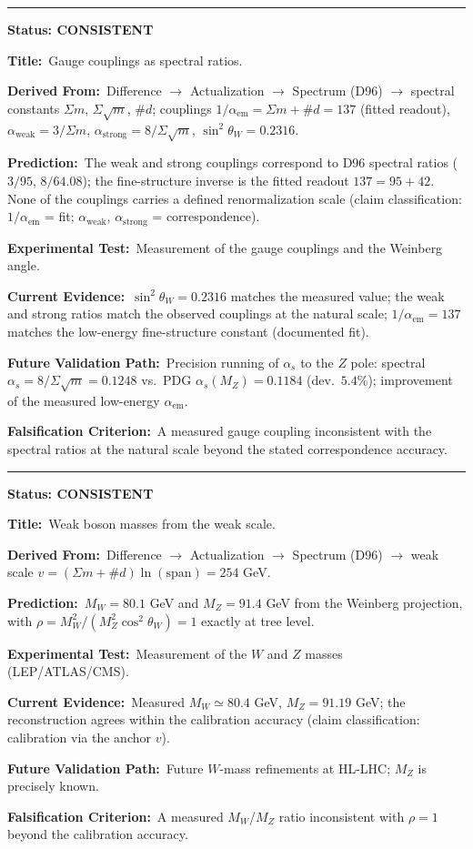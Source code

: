 \documentclass[11pt,a4paper]{article}
\newcommand{\predstart}[2]{%
  \par\medskip\noindent\hrule\par\smallskip
  \noindent{\large\bfseries #1}\hfill{\bfseries Status: #2}\par\smallskip
}
\newcommand{\pfield}[2]{%
  \noindent\textbf{#1:}~#2\par\smallskip
}
\begin{document}
\predstart{AT-P002}{CONSISTENT}
\pfield{Title}{Gauge couplings as spectral ratios.}
\pfield{Derived From}{Difference $\to$ Actualization $\to$ Spectrum (D96) $\to$ spectral
constants $\Sigma m$, $\Sigma\sqrt{m}$, $\#d$; couplings
$1/\alpha_{\mathrm{em}} = \Sigma m + \#d = 137$ (fitted readout),
$\alpha_{\mathrm{weak}} = 3/\Sigma m$, $\alpha_{\mathrm{strong}} = 8/\Sigma\sqrt{m}$,
$\sin^2\theta_W = 0.2316$.}
\pfield{Prediction}{The weak and strong couplings correspond to D96 spectral ratios
($3/95$, $8/64.08$); the fine-structure inverse is the fitted readout $137 = 95+42$.
None of the couplings carries a defined renormalization scale (claim classification:
$1/\alpha_{\mathrm{em}}$ = fit; $\alpha_{\mathrm{weak}}$, $\alpha_{\mathrm{strong}}$ =
correspondence).}
\pfield{Experimental Test}{Measurement of the gauge couplings and the Weinberg angle.}
\pfield{Current Evidence}{$\sin^2\theta_W = 0.2316$ matches the measured value; the weak and
strong ratios match the observed couplings at the natural scale; $1/\alpha_{\mathrm{em}} =
137$ matches the low-energy fine-structure constant (documented fit).}
\pfield{Future Validation Path}{Precision running of $\alpha_s$ to the $Z$ pole:
spectral $\alpha_s = 8/\Sigma\sqrt{m} = 0.1248$ vs.\ PDG $\alpha_s(M_Z) = 0.1184$
(dev.\ $5.4\%$); improvement of the measured low-energy $\alpha_{\mathrm{em}}$.}
\pfield{Falsification Criterion}{A measured gauge coupling inconsistent with the spectral
ratios at the natural scale beyond the stated correspondence accuracy.}

\predstart{AT-P003}{CONSISTENT}
\pfield{Title}{Weak boson masses from the weak scale.}
\pfield{Derived From}{Difference $\to$ Actualization $\to$ Spectrum (D96) $\to$ weak scale
$v = (\Sigma m + \#d)\ln(\mathrm{span}) = 254$ GeV.}
\pfield{Prediction}{$M_W = 80.1$ GeV and $M_Z = 91.4$ GeV from the Weinberg projection, with
$\rho = M_W^2/(M_Z^2\cos^2\theta_W) = 1$ exactly at tree level.}
\pfield{Experimental Test}{Measurement of the $W$ and $Z$ masses (LEP/ATLAS/CMS).}
\pfield{Current Evidence}{Measured $M_W \simeq 80.4$ GeV, $M_Z = 91.19$ GeV; the
reconstruction agrees within the calibration accuracy (claim classification: calibration via
the anchor $v$).}
\pfield{Future Validation Path}{Future $W$-mass refinements at HL-LHC; $M_Z$ is precisely
known.}
\pfield{Falsification Criterion}{A measured $M_W$/$M_Z$ ratio inconsistent with $\rho = 1$
beyond the calibration accuracy.}
\end{document}
